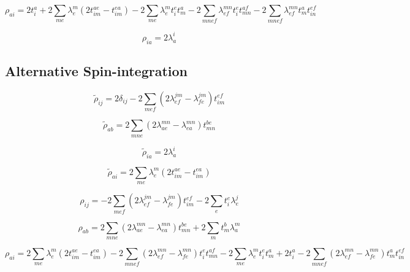 \documentclass{article}
\begin{document}
\begin{equation}
  \rho_{ai} = 2t_i^a + 2\sum_{me}\lambda_e^m\left(2t_{im}^{ae} - t_{im}^{ea}\right) - 2\sum_{me}\lambda_e^mt_i^et_m^a - 2\sum_{mnef}\lambda_{ef}^{mn}t_i^et_{mn}^{af} - 2\sum_{mnef}\lambda_{ef}^{mn}t_m^at_{in}^{ef}
\end{equation}

\begin{equation}
  \rho_{ia} = 2\lambda_a^i
\end{equation}

\subsection{Alternative Spin-integration}

\begin{equation}
  \tilde{\rho}_{ij} = 2\delta_{ij} - 2\sum_{mef}\left(2\lambda_{ef}^{jm} - \lambda_{fe}^{jm}\right)t_{im}^{ef}
\end{equation}

\begin{equation}
  \tilde{\rho}_{ab} = 2\sum_{mne}\left(2\lambda_{ae}^{mn} - \lambda_{ea}^{mn}\right)t_{mn}^{be}
\end{equation}

\begin{equation}
  \tilde{\rho}_{ia} = 2\lambda_a^i
\end{equation}

\begin{equation}
  \tilde{\rho}_{ai} = 2\sum_{me}\lambda_e^m\left(2t_{im}^{ae} - t_{im}^{ea}\right)
\end{equation}

\begin{equation}
  \rho_{ij} = -2\sum_{mef}\left(2\lambda_{ef}^{jm} - \lambda_{fe}^{jm}\right)t_{im}^{ef} - 2\sum_et_i^e\lambda_e^j
\end{equation}

\begin{equation}
  \rho_{ab} = 2\sum_{mne}\left(2\lambda_{ae}^{mn} - \lambda_{ea}^{mn}\right)t_{mn}^{be} + 2\sum_mt_m^b\lambda_a^m
\end{equation}

\begin{equation}
  \rho_{ai} = 2\sum_{me}\lambda_e^m\left(2t_{im}^{ae} - t_{im}^{ea}\right) - 2\sum_{mnef}\left(2\lambda_{ef}^{mn} - \lambda_{fe}^{mn}\right)t_i^et_{mn}^{af} - 2\sum_{me}\lambda_e^mt_i^et_m^a + 2t_i^a - 2\sum_{mnef}\left(2\lambda_{ef}^{mn} - \lambda_{fe}^{mn}\right)t_m^at_{in}^{ef}
\end{equation}
\end{document}
